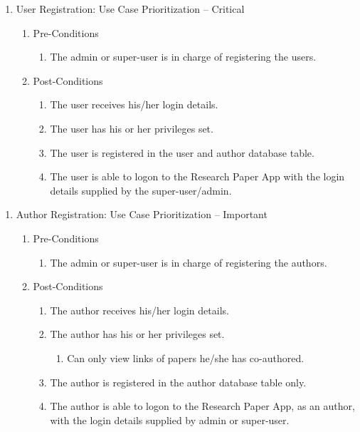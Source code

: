 \documentclass[hidelinks,a4paper,12pt]{article}
\begin{document}
\noindent  

\begin{enumerate}
	\item  User Registration: Use Case Prioritization -- Critical
	
	\begin{enumerate}
		\item  Pre-Conditions
		\begin{enumerate}
			\item  The admin or super-user is in charge of registering the users.
		\end{enumerate}
		\item  Post-Conditions
		\begin{enumerate}
			\item  The user receives his/her login details.
			\item  The user has his or her privileges set.
			\item  The user is registered in the user and author database table.	
			\item  The user is able to logon to the Research Paper App with the login details supplied by the super-user/admin.
		\end{enumerate}
	\end{enumerate}
\end{enumerate}

\noindent  

\begin{enumerate}
	\item  Author Registration:  Use Case Prioritization -- Important
	
	\begin{enumerate}
		\item  Pre-Conditions
		
		\begin{enumerate}
			\item  The admin or super-user is in charge of registering the authors.
		\end{enumerate}
		
		\item  Post-Conditions
		
		\begin{enumerate}
			\item  The author receives his/her login details.
			
			\item  The author has his or her privileges set.
			
			\begin{enumerate}
				\item  Can only view links of papers he/she has co-authored.
			\end{enumerate}
			
			\item  The author is registered in the author database table only.
			
			\item  The author is able to logon to the Research Paper App, as an author, with the login details supplied by admin or super-user.
		\end{enumerate}
	\end{enumerate}
\end{enumerate}
\end{document}
